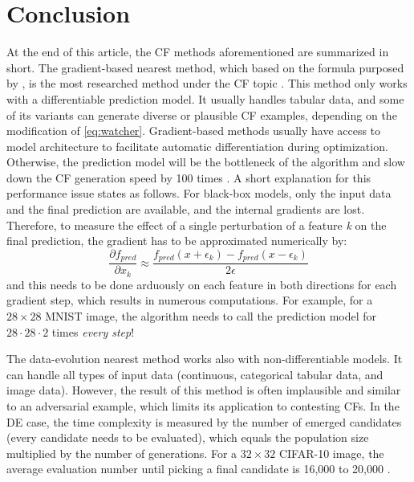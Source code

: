 \section{Conclusion}\label{sec:Conclude}
At the end of this article, the CF methods aforementioned are summarized in short. The gradient-based nearest method, which based on the formula purposed by \citeauthor{watcher2017} \cite{watcher2017}, is the most researched method under the CF topic \cite{CFReview}. This method only works with a differentiable prediction model. It usually handles tabular data, and some of its variants can generate diverse \cite{DiCE,russellDiverse} or plausible \cite{prototype} CF examples, depending on the modification of \autoref{eq:watcher}. Gradient-based methods usually have access to model architecture to facilitate automatic differentiation during optimization. Otherwise, the prediction model will be the bottleneck of the algorithm and slow down the CF generation speed by 100 times \cite{prototype}. A short explanation for this performance issue states as follows. For black-box models, only the input data and the final prediction are available, and the internal gradients are lost. Therefore, to measure the effect of a single perturbation of a feature \emph{k} on the final prediction, the gradient has to be approximated numerically by:
\begin{equation}\label{eq:gradientNumerical}
  \frac{\partial f_{pred}}{\partial x_k}\approx\frac{f_{pred}(x+\epsilon_k)-f_{pred}(x-\epsilon_k)}{2\epsilon}
\end{equation}
and this needs to be done arduously on each feature in both directions for each gradient step, which results in numerous computations. For example, for a $28\times28$ MNIST image, the algorithm needs to call the prediction model for $28\cdot28\cdot2$ times \emph{every step}!

The data-evolution nearest method works also with non-differentiable models. It can handle all types of input data (continuous, categorical tabular data, and image data). However, the result of this method is often implausible and similar to an adversarial example, which limits its application to contesting CFs. In the DE case, the time complexity is measured by the number of emerged candidates (every candidate needs to be evaluated), which equals the population size multiplied by the number of generations. For a $32\times32$ CIFAR-10 image, the average evaluation number until picking a final candidate is 16,000 to 20,000 \cite{onePixel}.

